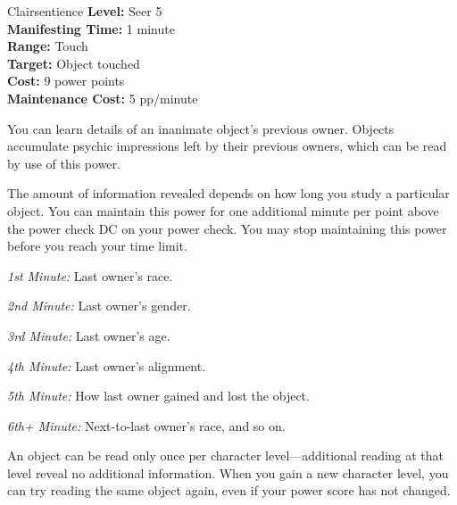 {Clairsentience}
{
	\textbf{Level:}
	Seer 5\\
	\textbf{Manifesting Time:}
	1 minute\\
	\textbf{Range:}
	Touch\\
	\textbf{Target:}
	Object touched\\
	\textbf{Cost:}
	9 power points\\
	\textbf{Maintenance Cost:}
	5 pp/minute\\
}
{
	You can learn details of an inanimate object's previous owner. Objects accumulate psychic impressions left by their previous owners, which can be read by use of this power.

	The amount of information revealed depends on how long you study a particular object. You can maintain this power for one additional minute per point above the power check DC on your power check. You may stop maintaining this power before you reach your time limit.

	\textit{1st Minute:} Last owner's race.

	\textit{2nd Minute:} Last owner's gender.

	\textit{3rd Minute:} Last owner's age.

	\textit{4th Minute:} Last owner's alignment.

	\textit{5th Minute:} How last owner gained and lost the object.

	\textit{6th+ Minute:} Next-to-last owner's race, and so on.

	An object can be read only once per character level---additional reading at that level reveal no additional information. When you gain a new character level, you can try reading the same object again, even if your power score has not changed.
}